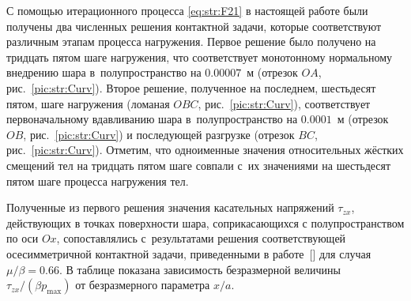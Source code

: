 С помощью итерационного процесса \eqref{eq:str:F21} в настоящей работе были получены два численных решения контактной задачи, которые соответствуют различным этапам процесса нагружения.
Первое решение было получено на тридцать пятом шаге нагружения, что соответствует монотонному нормальному внедрению шара в~полупространство на $0{.}00007$~{м} (отрезок ${OA}$, рис.~\ref{pic:str:Curv}).
Второе решение, полученное на последнем, шестьдесят пятом, шаге нагружения (ломаная ${OBC}$, рис.~\ref{pic:str:Curv}), соответствует  первоначальному вдавливанию шара в~полупространство на $0{.}0001$~{м} (отрезок ${OB}$, рис.~\ref{pic:str:Curv}) и  последующей  разгрузке (отрезок ${BC}$, рис.~\ref{pic:str:Curv}).
Отметим, что одноименные значения относительных жёстких смещений тел на тридцать пятом шаге совпали с~их значениями на шестьдесят пятом шаге процесса нагружения тел.


Полученные из первого решения значения касательных напряжений $\tau _{zx} $, действующих в точках поверхности шара, соприкасающихся с полупространством по оси $Ox$, сопоставлялись с~результатами решения соответствующей осесимметричной контактной задачи, приведенными в работе~[] для случая ${\mu }/{\beta } =0{.}66$.
В таблице показана зависимость безразмерной величины ${\tau _{zx} }/({\beta p_{\max } }) $ от безразмерного параметра ${x}/{a} $.

